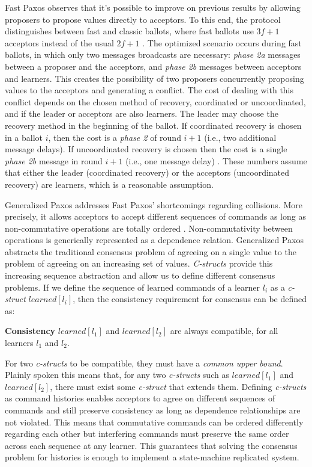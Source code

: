 \documentclass[runningheads,a4paper]{llncs}
\begin{document}
Fast Paxos observes that it's possible to improve on previous results by allowing proposers to propose values directly to acceptors. To this end, the protocol distinguishes between fast and classic ballots, where fast ballots use $3f+1$ acceptors instead of the usual $2f+1$ \cite{Lamport2006}. The optimized scenario occurs during fast ballots, in which only two messages broadcasts are necessary: \textit{phase 2a} messages between a proposer and the acceptors, and \textit{phase 2b} messages between acceptors and learners. This creates the possibility of two proposers concurrently proposing values to the acceptors and generating a conflict. The cost of dealing with this conflict depends on the chosen method of recovery, coordinated or uncoordinated, and if the leader or acceptors are also learners. The leader may choose  the recovery method in the beginning of the ballot. If coordinated recovery is chosen in a ballot $i$, then the cost is a \textit{phase 2} of round $i+1$ (i.e., two additional message delays). If uncoordinated recovery is chosen then the cost is a single \textit{phase 2b} message in round $i+1$ (i.e., one message delay) \cite{Lamport2006}. These numbers assume that either the leader (coordinated recovery) or the acceptors (uncoordinated recovery) are learners, which is a reasonable assumption. \par
Generalized Paxos addresses Fast Paxos' shortcomings regarding collisions. More precisely, it allows acceptors to accept different sequences of commands as long as non-commutative operations are totally ordered \cite{Lamport2005}.  Non-commutativity between operations is generically represented as a dependence relation. Generalized Paxos abstracts the traditional consensus problem of agreeing on a single value to the problem of agreeing on an increasing set of values. \textit{C-structs} provide this increasing sequence abstraction and allow us to define different consensus problems. If we define the sequence of learned commands of a learner $l_i$ as a \textit{c-struct} $learned[l_i]$, then the consistency requirement for consensus can be defined as:\par
{}\textbf{Consistency} $learned[l_1]$ and $learned[l_2]$ are always compatible, for all learners $l_1$ and $l_2$. \par
For two \textit{c-structs} to be compatible, they must have a \textit{common upper bound}. Plainly spoken this means that, for any two \textit{c-structs} such as $learned[l_1]$ and $learned[l_2]$, there must exist some \textit{c-struct} that extends them. Defining \textit{c-structs} as command histories enables acceptors to agree on different sequences of commands and still preserve consistency as long as dependence relationships are not violated. This means that commutative commands can be ordered differently regarding each other but interfering commands must preserve the same order across each sequence at any learner. This guarantees that solving the consensus problem for histories is enough to implement a state-machine replicated system. \par
\end{document}
